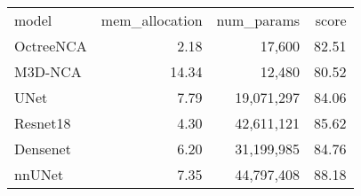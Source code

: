 \begin{tabular}{lrrr}
model & mem_allocation & num_params & score \\
OctreeNCA & 2.18 & 17,600 & 82.51 \\
M3D-NCA & 14.34 & 12,480 & 80.52 \\
UNet & 7.79 & 19,071,297 & 84.06 \\
Resnet18 & 4.30 & 42,611,121 & 85.62 \\
Densenet & 6.20 & 31,199,985 & 84.76 \\
nnUNet & 7.35 & 44,797,408 & 88.18 \\
\end{tabular}
